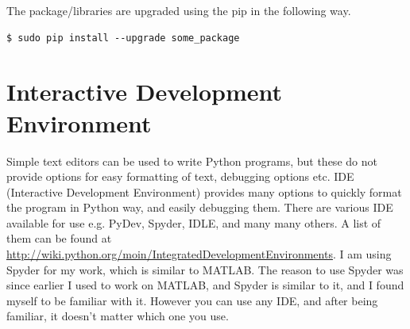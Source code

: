 \documentclass[10pt]{book}
\begin{document}
The package/libraries are upgraded using the pip in the following way.
\beforeverb
\begin{verbatim}
$ sudo pip install --upgrade some_package
\end{verbatim}
\afterverb
{}

\section{Interactive Development Environment}
Simple text editors can be used to write Python programs, but these do not provide options for easy formatting of text, debugging options etc.  
IDE (Interactive Development Environment) provides many options to quickly format the program in Python way, and easily debugging them. There are various IDE available for use e.g. PyDev, Spyder, IDLE, and many many others. A list of them can be found at \url{http://wiki.python.org/moin/IntegratedDevelopmentEnvironments}. I am using Spyder for my work, which is similar to MATLAB. The reason to use Spyder was since earlier I used to work on MATLAB, and Spyder is similar to it, and I found myself to be familiar with it. However you can use any IDE, and after being familiar, it doesn't matter which one you use. 
\end{document}
